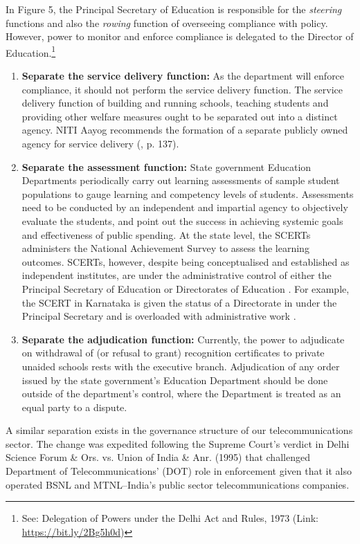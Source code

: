 \documentclass[a4paper, 12pt, twoside]{article}
\begin{document}
In Figure 5, the Principal Secretary of Education is responsible for the \textit{steering} functions and also the \textit{rowing} function of overseeing compliance with policy. However, power to monitor and enforce compliance is delegated to the Director of Education.\footnote{See: Delegation of Powers under the Delhi Act and Rules, 1973 (Link: \href{https://bit.ly/2Bg5h0d}{https://bit.ly/2Bg5h0d})} 

\begin{enumerate}
\item \textbf{Separate the service delivery function:} As the department will enforce compliance, it should not perform the service delivery function. The service delivery function of building and running schools, teaching students and providing other welfare measures ought to be separated out into a distinct agency. NITI Aayog recommends the formation of a separate publicly owned agency for service delivery (\cite{niti3yearagenda}, p. 137).

\item \textbf{Separate the assessment function:} State government Education Departments periodically carry out learning assessments of sample student populations to gauge learning and competency levels of students. Assessments need to be conducted by an independent and impartial agency to objectively evaluate the students, and point out the success in achieving systemic goals and effectiveness of public spending. At the state level, the SCERTs administers the National Achievement Survey to assess the learning outcomes. SCERTs, however, despite being conceptualised and established as independent institutes, are under the administrative control of either the Principal Secretary of Education or Directorates of Education \parencite{scerts}. For example, the SCERT in Karnataka is given the status of a Directorate in under the Principal Secretary and is overloaded with administrative work \parencite{scert_structures}.

\item \textbf{Separate the adjudication function:} Currently, the power to adjudicate on withdrawal of (or refusal to grant) recognition certificates to private unaided schools rests with the executive branch. Adjudication of any order issued by the state government’s Education Department should be done outside of the department’s control, where the Department is treated as an equal party to a dispute. 

\end{enumerate}
A similar separation exists in the governance structure of our telecommunications sector. The change was expedited following the Supreme Court’s verdict in Delhi Science Forum \& Ors. vs. Union of India \& Anr. (1995) that challenged Department of Telecommunications’ (DOT) role in enforcement given that it also operated BSNL and MTNL–India’s public sector telecommunications companies. 
\end{document}
